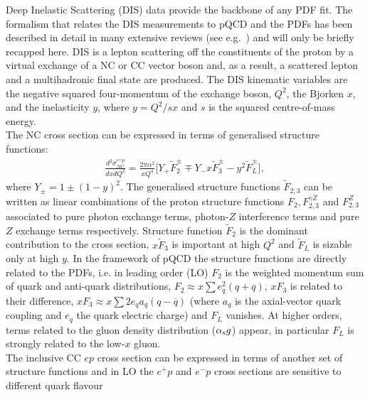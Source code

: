 Deep Inelastic Scattering (DIS) data provide the backbone of any PDF fit.
The formalism that relates the DIS measurements to pQCD and the PDFs has been described
 in detail in many extensive reviews (see e.g.~\cite{disbook}) and will only be briefly recapped here.
DIS is a lepton scattering off the 
constituents of the proton by a virtual exchange of a NC 
or CC vector boson and, as a result, a scattered lepton and a 
multihadronic final state are produced.
The DIS kinematic variables are the negative squared four-momentum of 
the exchange boson, $Q^2$, the Bjorken $x$, 
and the inelasticity $y$, where $y=Q^2/sx$ and $s$ is the squared centre-of-mass energy.
\\
%
The NC cross section can be expressed in terms of generalised structure functions:
\begin{eqnarray}
   \frac{d^2\sigma_{NC}^{e^{\pm} p}}{dxdQ^2}=\frac{2\pi\alpha^2}{xQ^4} 
     \big [ Y_{+} \tilde F_2^{\pm} \mp Y_{-}x \tilde F_3^{\pm} - y^2 \tilde F_L^{\pm} \big ],
\end{eqnarray}
where $Y_{\pm} = 1 \pm (1-y)^2$. The generalised structure functions $\tilde F_{2,3}$ 
can be written as linear combinations of the proton structure functions $F_2, F_{2,3}^{\gamma Z}$ 
and $F_{2,3}^Z$ associated to pure photon exchange terms, photon-$Z$ interference
terms and pure $Z$ exchange terms respectively. 
Structure function $\tilde F_2$ is the dominant contribution to the cross section, 
$x \tilde F_3$ is important at high $Q^2$ and $\tilde F_L$ is sizable 
only at high $y$. 
In the framework of pQCD the structure functions are directly related to the 
PDFs, i.e. in leading order (LO)  $F_2$ is the weighted momentum sum of quark and anti-quark distributions, 
$F_2 \approx x \sum e^2_q (q+ \overline q)$, $xF_3$ is related to their difference, 
$xF_3 \approx x \sum 2e_q a_q (q- \overline q)$ (where $a_q$ is the axial-vector 
quark coupling and $e_q$ the quark electric charge) and $F_L$ vanishes. 
At higher orders, terms related to the gluon density distribution
($\alpha_\mathrm{s} g$) appear, in particular $F_L$ is strongly related to the low-$x$ 
gluon.
\\
The inclusive CC $ep$ cross section can be expressed 
in terms of another set of structure functions and in LO the $e^+p$ and $e^-p$ cross sections are sensitive to different quark flavour 
